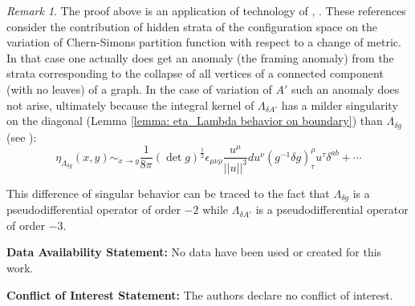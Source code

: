 \documentclass[11pt,a4paper]{amsart}
\theoremstyle{plain} %
\theoremstyle{definition}
\theoremstyle{remark}
\newtheorem{rem}[thm]{Remark}
\newcommand{\ra}{\rightarrow}
\begin{document}
\begin{rem}
    The proof above is an application of technology of \cite{Axelrod1994}, \cite[Appendix A]{Cattaneo2008}. These references consider the contribution of hidden strata of the configuration space on the variation of Chern-Simons partition function with respect to a change of metric. In that case one actually does get an anomaly (the framing anomaly) from the strata corresponding to the collapse of all vertices of a connected component (with no leaves) of a graph. In the case of variation of $A'$ such an anomaly does not arise, ultimately because the integral kernel of $\Lambda_{\delta A'}$ has a milder singularity on the diagonal (Lemma \ref{lemma: eta_Lambda behavior on boundary}) than $\Lambda_{\delta g}$ (see \cite[PL6]{Axelrod1991}): 
    \begin{equation*}
        \eta_{\Lambda_{\delta g}}(x,y)\sim_{x\ra y} \frac{1}{8\pi} (\det g)^{\frac12} \epsilon_{\mu\nu\rho} \frac{u^\mu}{|| u||^3} du^\nu (g^{-1}\delta g)^\rho_{\tau} u^\tau \delta^{ab}+\cdots
    \end{equation*}
    

This difference of singular behavior can be traced to the fact that $\Lambda_{\delta g}$ is a pseudodifferential operator of order $-2$ while $\Lambda_{\delta A'}$ is a pseudodifferential operator of order $-3$.

\end{rem}
 
\printbibliography

\textbf{Data Availability Statement:}  No data have been used or created for this work. 

\textbf{Conflict of Interest Statement:}  The authors declare no conflict of interest. 
\end{document}
